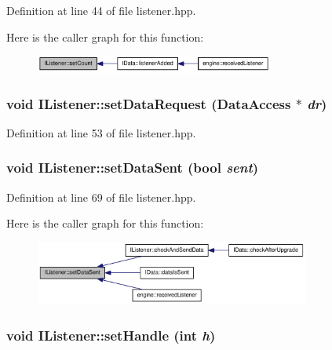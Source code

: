 Definition at line 44 of file listener.hpp.

Here is the caller graph for this function:\nopagebreak
\begin{figure}[H]
\begin{center}
\leavevmode
\includegraphics[width=222pt]{class_i_listener_a9def0a8ed3ed91e1956b7b9ce1473b2e_icgraph}
\end{center}
\end{figure}
\hypertarget{class_i_listener_a338e30d25c88f4fd7ce341e666cddc0f}{
\subsubsection[{setDataRequest}]{\setlength{\rightskip}{0pt plus 5cm}void IListener::setDataRequest ({\bf DataAccess} $\ast$ {\em dr})}}
\label{class_i_listener_a338e30d25c88f4fd7ce341e666cddc0f}


Definition at line 53 of file listener.hpp.\hypertarget{class_i_listener_a54c8d2e23951e95dbb6eae79b6c9d975}{
\subsubsection[{setDataSent}]{\setlength{\rightskip}{0pt plus 5cm}void IListener::setDataSent (bool {\em sent})}}
\label{class_i_listener_a54c8d2e23951e95dbb6eae79b6c9d975}


Definition at line 69 of file listener.hpp.

Here is the caller graph for this function:\nopagebreak
\begin{figure}[H]
\begin{center}
\leavevmode
\includegraphics[width=256pt]{class_i_listener_a54c8d2e23951e95dbb6eae79b6c9d975_icgraph}
\end{center}
\end{figure}
\hypertarget{class_i_listener_a4649d89b151d60d9c9fe82e5f3a7a98d}{
\subsubsection[{setHandle}]{\setlength{\rightskip}{0pt plus 5cm}void IListener::setHandle (int {\em h})}}
\label{class_i_listener_a4649d89b151d60d9c9fe82e5f3a7a98d}


